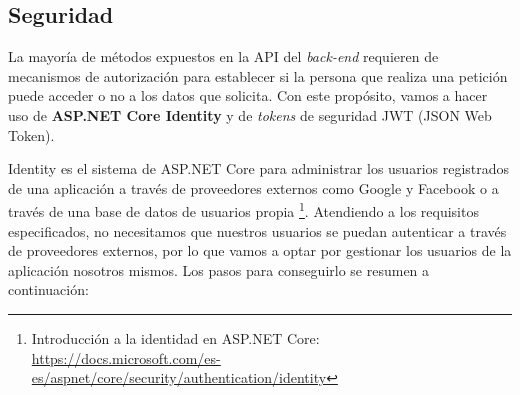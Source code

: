\documentclass[11pt,spanish,listoffigures]{tfgetsinf}
\begin{document}
\subsection{Seguridad}

La mayoría de métodos expuestos en la API del \textit{back-end} requieren de mecanismos de autorización para establecer si la persona que realiza una petición puede acceder o no a los datos que solicita. Con este propósito, vamos a hacer uso de \textbf{ASP.NET Core Identity} y de \textit{tokens} de seguridad JWT (JSON Web Token). 

Identity es el sistema de ASP.NET Core para administrar los usuarios registrados de una aplicación a través de proveedores externos como Google y Facebook o a través de una base de datos de usuarios propia \footnote{ Introducción a la identidad en ASP.NET Core: \url{https://docs.microsoft.com/es-es/aspnet/core/security/authentication/identity}}. Atendiendo a los requisitos especificados, no necesitamos que nuestros usuarios se puedan autenticar a través de proveedores externos, por lo que vamos a optar por gestionar los usuarios de la aplicación nosotros mismos. Los pasos para conseguirlo se resumen a continuación:
\end{document}
